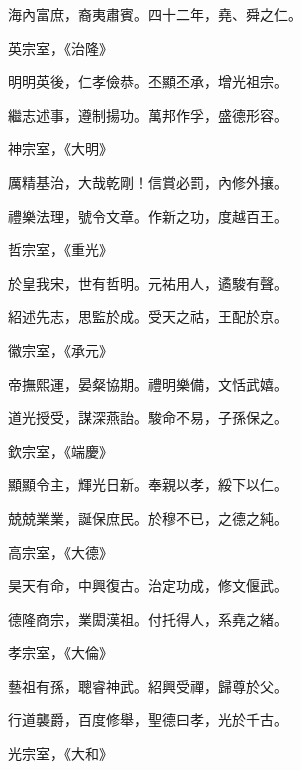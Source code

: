 \begin{pinyinscope}
 海內富庶，裔夷肅賓。四十二年，堯、舜之仁。



 英宗室，《治隆》



 明明英後，仁孝儉恭。丕顯丕承，增光祖宗。



 繼志述事，遵制揚功。萬邦作孚，盛德形容。



 神宗室，《大明》



 厲精基治，大哉乾剛！信賞必罰，內修外攘。



 禮樂法理，號令文章。作新之功，度越百王。



 哲宗室，《重光》



 於皇我宋，世有哲明。元祐用人，遹駿有聲。



 紹述先志，思監於成。受天之祜，王配於京。



 徽宗室，《承元》



 帝撫熙運，晏粲協期。禮明樂備，文恬武嬉。



 道光授受，謀深燕詒。駿命不易，子孫保之。



 欽宗室，《端慶》



 顯顯令主，輝光日新。奉親以孝，綏下以仁。



 兢兢業業，誕保庶民。於穆不已，之德之純。



 高宗室，《大德》



 昊天有命，中興復古。治定功成，修文偃武。



 德隆商宗，業閎漢祖。付托得人，系堯之緒。



 孝宗室，《大倫》



 藝祖有孫，聰睿神武。紹興受禪，歸尊於父。



 行道襲爵，百度修舉，聖德曰孝，光於千古。



 光宗室，《大和》




\end{pinyinscope}
